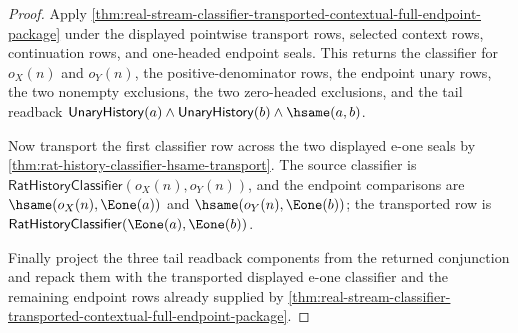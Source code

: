 \begin{proof}
Apply
\autoref{thm:real-stream-classifier-transported-contextual-full-endpoint-package}
under the displayed pointwise transport rows, selected context rows,
continuation rows, and one-headed endpoint seals. This returns the classifier
for $o_X(n)$ and $o_Y(n)$, the positive-denominator rows, the endpoint unary
rows, the two nonempty exclusions, the two zero-headed exclusions, and the tail
readback
$\mathsf{UnaryHistory}(a)\land\mathsf{UnaryHistory}(b)\land\hsame(a,b)$.

Now transport the first classifier row across the two displayed e-one seals by
\autoref{thm:rat-history-classifier-hsame-transport}. The source classifier is
$\mathsf{RatHistoryClassifier}(o_X(n),o_Y(n))$, and the endpoint comparisons are
$\hsame(o_X(n),\Eone(a))$ and $\hsame(o_Y(n),\Eone(b))$; the transported row is
$\mathsf{RatHistoryClassifier}(\Eone(a),\Eone(b))$.

Finally project the three tail readback components from the returned
conjunction and repack them with the transported displayed e-one classifier and
the remaining endpoint rows already supplied by
\autoref{thm:real-stream-classifier-transported-contextual-full-endpoint-package}.
\end{proof}
